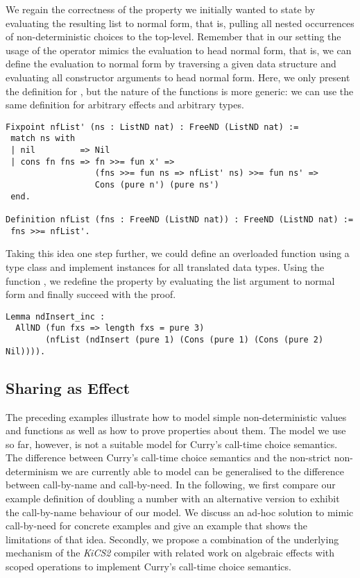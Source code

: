We regain the correctness of the property we initially wanted to state by evaluating the resulting list to normal form, that is, pulling all nested occurrences of non\--deterministic choices to the top\--level.
Remember that in our setting the usage of the operator \cinl{>>=} mimics the evaluation to head normal form, that is, we can define the evaluation to normal form by traversing a given data structure and evaluating all constructor arguments to head normal form.
Here, we only present the definition for , but the nature of the functions is more generic: we can use the same definition for arbitrary effects and arbitrary types.

\begin{verbatim}
Fixpoint nfList' (ns : ListND nat) : FreeND (ListND nat) :=
 match ns with
 | nil         => Nil
 | cons fn fns => fn >>= fun x' =>
                  (fns >>= fun ns => nfList' ns) >>= fun ns' =>
                  Cons (pure n') (pure ns')
 end.

Definition nfList (fns : FreeND (ListND nat)) : FreeND (ListND nat) :=
 fns >>= nfList'.
\end{verbatim}

Taking this idea one step further, we could define an overloaded function  using a type class and implement instances for all translated data types.
Using the function , we redefine the property by evaluating the list argument to normal form and finally succeed with the proof.

\begin{verbatim}
Lemma ndInsert_inc :
  AllND (fun fxs => length fxs = pure 3)
        (nfList (ndInsert (pure 1) (Cons (pure 1) (Cons (pure 2) Nil)))).
\end{verbatim}

\subsection{Sharing as Effect}

The preceding examples illustrate how to model simple non\--deterministic values and functions as well as how to prove properties about them.
The model we use so far, however, is not a suitable model for Curry's call\--time choice semantics.
The difference between Curry's call\--time choice semantics and the non\--strict non\--determinism we are currently able to model can be generalised to the difference between call\--by\--name and call\--by\--need.
In the following, we first compare our example definition of doubling a number with an alternative version to exhibit the call\--by\--name behaviour of our model.
We discuss an ad\--hoc solution to mimic call\--by\--need for concrete examples and give an example that shows the limitations of that idea.
Secondly, we propose a combination of the underlying mechanism of the \emph{KiCS2} compiler with related work on algebraic effects with scoped operations to implement Curry's call\--time choice semantics.


